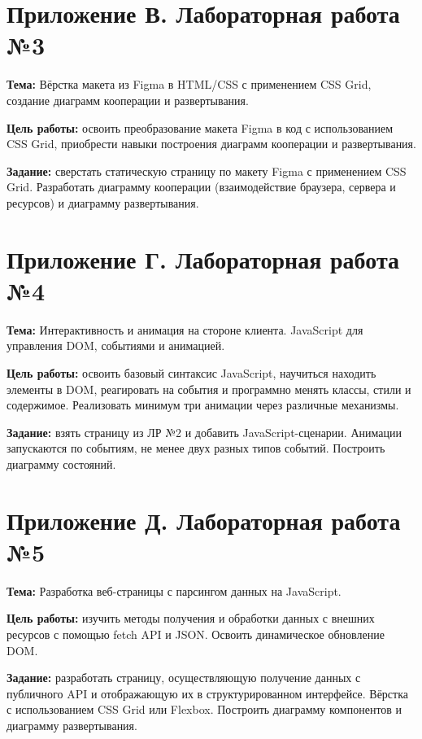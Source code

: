 \section*{Приложение В. Лабораторная работа №3}

\textbf{Тема:} Вёрстка макета из Figma в HTML/CSS с применением CSS Grid, создание диаграмм кооперации и развертывания.

\textbf{Цель работы:} освоить преобразование макета Figma в код с использованием CSS Grid, приобрести навыки построения диаграмм кооперации и развертывания.

\textbf{Задание:} сверстать статическую страницу по макету Figma с применением CSS Grid. Разработать диаграмму кооперации (взаимодействие браузера, сервера и ресурсов) и диаграмму развертывания.

\section*{Приложение Г. Лабораторная работа №4}

\textbf{Тема:} Интерактивность и анимация на стороне клиента. JavaScript для управления DOM, событиями и анимацией.

\textbf{Цель работы:} освоить базовый синтаксис JavaScript, научиться находить элементы в DOM, реагировать на события и программно менять классы, стили и содержимое. Реализовать минимум три анимации через различные механизмы.

\textbf{Задание:} взять страницу из ЛР №2 и добавить JavaScript-сценарии. Анимации запускаются по событиям, не менее двух разных типов событий. Построить диаграмму состояний.

\section*{Приложение Д. Лабораторная работа №5}

\textbf{Тема:} Разработка веб-страницы с парсингом данных на JavaScript.

\textbf{Цель работы:} изучить методы получения и обработки данных с внешних ресурсов с помощью fetch API и JSON. Освоить динамическое обновление DOM.

\textbf{Задание:} разработать страницу, осуществляющую получение данных с публичного API и отображающую их в структурированном интерфейсе. Вёрстка с использованием CSS Grid или Flexbox. Построить диаграмму компонентов и диаграмму развертывания.

